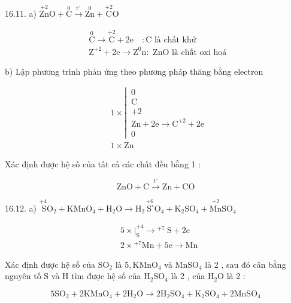 \documentclass[10pt]{article}
\begin{document}
16.11. a) $\stackrel{+2}{\mathrm{Zn}} \mathrm{O}+\stackrel{0}{\mathrm{C}} \xrightarrow{\mathrm{t}^{\circ}} \stackrel{0}{\mathrm{Zn}}+\stackrel{+2}{\mathrm{C}} \mathrm{O}$

$$
\begin{aligned}
& \stackrel{0}{\mathrm{C}} \longrightarrow \stackrel{+2}{\mathrm{C}}+2 \mathrm{e} \quad: \mathrm{C} \text { là chất khử } \\
& \mathrm{Z}^{+2}+2 \mathrm{e} \longrightarrow \mathrm{Z}^{0} \mathrm{n}: \text { ZnO là chất oxi hoá }
\end{aligned}
$$

b) Lập phương trình phản ứng theo phương pháp thăng bằng electron

$$
\begin{aligned}
& 1 \times \left\lvert\, \begin{array}{l}
0 \\
\mathrm{C} \\
+2 \\
\mathrm{Zn}+2 \mathrm{e} \longrightarrow \mathrm{C}^{+2}+2 \mathrm{e} \\
0
\end{array}\right. \\
& 1 \times \mathrm{Zn}
\end{aligned}
$$

Xác định được hệ số của tất cả các chất đều bằng 1 :

$$
\mathrm{ZnO}+\mathrm{C} \xrightarrow{\mathrm{t}^{\circ}} \mathrm{Zn}+\mathrm{CO}
$$

16.12. a) $\stackrel{+4}{\mathrm{~S}} \mathrm{O}_{2}+\mathrm{KMnO}_{4}+\mathrm{H}_{2} \mathrm{O} \longrightarrow \mathrm{H}_{2} \stackrel{+6}{\mathrm{~S}^{\circ}} \mathrm{O}_{4}+\mathrm{K}_{2} \mathrm{SO}_{4}+\stackrel{+2}{\mathrm{Mn}} \mathrm{SO}_{4}$

$$
\begin{aligned}
& 5 \times\left.\right|_{\mathrm{S}} ^{+4} \longrightarrow{ }^{+7} \mathrm{~S}+2 \mathrm{e} \\
& 2 \times{ }^{+7} \mathrm{Mn}+5 \mathrm{e} \longrightarrow \mathrm{Mn}
\end{aligned}
$$

Xác định được hệ số của $\mathrm{SO}_{2}$ là $5, \mathrm{KMnO}_{4}$ và $\mathrm{MnSO}_{4}$ là 2 , sau đó cân bằng nguyên tố S và H tìm được hệ số của $\mathrm{H}_{2} \mathrm{SO}_{4}$ là 2 , của $\mathrm{H}_{2} \mathrm{O}$ là 2 :

$$
5 \mathrm{SO}_{2}+2 \mathrm{KMnO}_{4}+2 \mathrm{H}_{2} \mathrm{O} \longrightarrow 2 \mathrm{H}_{2} \mathrm{SO}_{4}+\mathrm{K}_{2} \mathrm{SO}_{4}+2 \mathrm{MnSO}_{4}
$$
\end{document}
